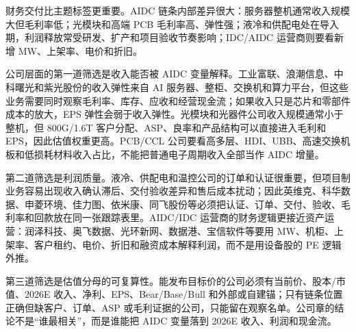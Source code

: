 财务交付比主题标签更重要。AIDC 链条内部差异很大：服务器整机通常收入规模大但毛利率低；光模块和高端 PCB 毛利率高、弹性强；液冷和供配电处在导入期，利润释放常受研发、扩产和项目验收节奏影响；IDC/AIDC 运营商则要看新增 MW、上架率、电价和折旧。

公司层面的第一道筛选是收入能否被 AIDC 变量解释。工业富联、浪潮信息、中科曙光和紫光股份的收入弹性来自 AI 服务器、整柜、交换机和算力平台，但这些业务需要同时观察毛利率、库存、应收和经营现金流；如果收入只是芯片和零部件成本的放大，EPS 弹性会弱于收入弹性。光模块和光器件公司收入规模通常小于整机，但 800G/1.6T 客户分配、ASP、良率和产品结构可以直接进入毛利和 EPS，因此估值权重更高。PCB/CCL 公司要看高多层、HDI、UBB、高速交换机板和低损耗材料收入占比，不能把普通电子周期收入全部当作 AIDC 增量。

第二道筛选是利润质量。液冷、供配电和温控公司的订单和认证很重要，但项目制业务容易出现收入确认滞后、交付验收差异和售后成本扰动；因此英维克、科华数据、申菱环境、佳力图、依米康、同飞股份等必须把认证、订单、交付、验收、毛利率和回款放在同一张跟踪表里。AIDC/IDC 运营商的财务逻辑更接近资产运营：润泽科技、奥飞数据、光环新网、数据港、宝信软件等要用 MW、机柜、上架率、客户租约、电价、折旧和融资成本解释利润，而不是用设备股的 PE 逻辑外推。

第三道筛选是估值分母的可复算性。能发布目标价的公司必须有当前价、股本/市值、2026E 收入、净利、EPS、Bear/Base/Bull 和外部或自建锚；只有链条位置正确但缺客户、订单、ASP 或毛利证据的公司，只能留在观察名单。公司章的结论不是“谁最相关”，而是谁能把 AIDC 变量落到 2026E 收入、利润和现金流。


